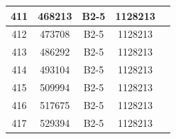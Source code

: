 \documentclass[UTF8,10pt,a4paper,fontset=fandol]{ctexart}
\newcommand{\fieldvalue}[1]{#1}
\begin{document}
\begin{center}
\begin{tabular}{|c|c|c|c|c|}
\fieldvalue{411} &
\fieldvalue{468213} &
\fieldvalue{B2-5} &
\fieldvalue{1128213} & \\ \hline

\fieldvalue{412} &
\fieldvalue{473708} &
\fieldvalue{B2-5} &
\fieldvalue{1128213} & \\ \hline

\fieldvalue{413} &
\fieldvalue{486292} &
\fieldvalue{B2-5} &
\fieldvalue{1128213} & \\ \hline

\fieldvalue{414} &
\fieldvalue{493104} &
\fieldvalue{B2-5} &
\fieldvalue{1128213} & \\ \hline

\fieldvalue{415} &
\fieldvalue{509994} &
\fieldvalue{B2-5} &
\fieldvalue{1128213} & \\ \hline

\fieldvalue{416} &
\fieldvalue{517675} &
\fieldvalue{B2-5} &
\fieldvalue{1128213} & \\ \hline

\fieldvalue{417} &
\fieldvalue{529394} &
\fieldvalue{B2-5} &
\fieldvalue{1128213} & \\ \hline


\end{tabular}
\end{center}
\end{document}

